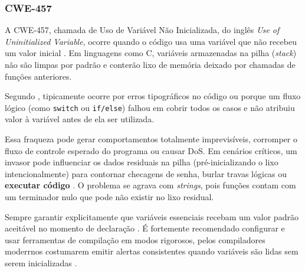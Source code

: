 \documentclass[
    12pt,                %
    openright,           %
    oneside,             %
    a4paper,             %
    english,             %
    brazil               %
]{abntex2}
\begin{document}
\subsubsection{CWE-457}
\label{sec:457}
\par
A CWE-457, chamada de Uso de Variável Não Inicializada, do inglês \textit{Use of Uninitialized Variable}, ocorre quando o código usa uma variável que não recebeu um valor inicial \cite{cwe457}.
Em linguagens como C, variáveis armazenadas na pilha (\textit{stack}) não são limpas por padrão e conterão lixo de memória deixado por chamadas de funções anteriores.
\par
Segundo , tipicamente ocorre por erros tipográficos no código ou porque um fluxo lógico (como \texttt{switch} ou \texttt{if/else}) falhou em cobrir todos os casos e não atribuiu valor à variável antes de ela ser utilizada.
\par
Essa fraqueza pode gerar comportamentos totalmente imprevisíveis, corromper o fluxo de controle esperado do programa ou causar DoS.
Em cenários críticos, um invasor pode influenciar os dados residuais na pilha (pré-inicializando o lixo intencionalmente) para contornar checagens de senha, burlar travas lógicas ou \textbf{executar código} \cite{cwe457}.
O problema se agrava com \textit{strings}, pois funções contam com um terminador nulo que pode não existir no lixo residual.
\par
Sempre garantir explicitamente que variáveis essenciais recebam um valor padrão aceitável no momento de declaração \cite{cwe457}.
É fortemente recomendado configurar e usar ferramentas de compilação em modos rigorosos, pelos compiladores moderrnos costumarem emitir alertas consistentes quando variáveis são lidas sem serem inicializadas \cite{cwe457}.
\end{document}
